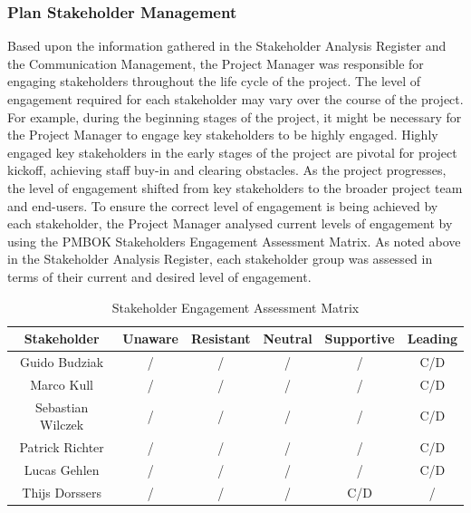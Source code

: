 \subsubsection{Plan Stakeholder Management}
\label{sssec:plan_stakeholder_management}

Based upon the information gathered in the Stakeholder Analysis Register and the Communication Management, the Project Manager was responsible for engaging stakeholders throughout the life cycle of the project. The level of engagement required for each stakeholder may vary over the course of the project. For example, during the beginning stages of the project, it might be necessary for the Project Manager to engage key stakeholders to be highly engaged.  Highly engaged key stakeholders in the early stages of the project are pivotal for project kickoff, achieving staff buy-in and clearing obstacles. As the project progresses, the level of engagement shifted from key stakeholders to the broader project team and end-users.  
\newline
To ensure the correct level of engagement is being achieved by each stakeholder, the Project Manager analysed current levels of engagement by using the PMBOK Stakeholders Engagement Assessment Matrix.  As noted above in the Stakeholder Analysis Register, each stakeholder group was assessed in terms of their current and desired level of engagement.
 
 \begin{table}[H]
    \centering
    \begin{tabular}{|c|c|c|c|c|c|}
        \hline
        \cellcolor{gray}Stakeholder & \cellcolor{gray}Unaware & 
        \cellcolor{gray}Resistant & \cellcolor{gray}Neutral & 
        \cellcolor{gray}Supportive & \cellcolor{gray}Leading\\ \hline
        Guido Budziak & / & / & / & / & C/D \\ \hline
        Marco Kull & / & / & / & / & C/D   \\ \hline
        Sebastian Wilczek & / & / & / & / & C/D   \\ \hline
        Patrick Richter & / & / & / & / & C/D    \\ \hline
        Lucas Gehlen & / & / & / & / & C/D   \\ \hline
        Thijs Dorssers & / & / & / & C/D  & / \\ \hline
    \end{tabular}
    \caption{Stakeholder Engagement Assessment Matrix}
    \label{tab:stakeholder_engagement_assessment_matrix}
\end{table}

